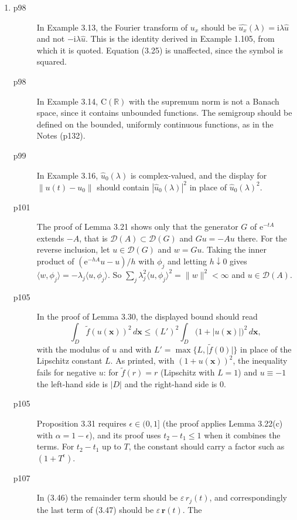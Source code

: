\documentclass[final]{article}
\theoremstyle{definition}
\newcommand{\vecbs}[1]{\boldsymbol{#1}}
\renewcommand{\vec}[1]{{\vecbs{#1}}}
\begin{document}
\begin{enumerate}
\begin{description}
   \end{description}
 \item%
   \begin{description}
   \item[p98] In Example 3.13, the Fourier transform of $u_x$ should be
$\widehat{u_x}(\lambda)=\mathrm{i}\lambda\widehat{u}$ and not
$-\mathrm{i}\lambda\widehat{u}$. This is the identity derived in Example 1.105,
from which it is quoted. Equation (3.25) is unaffected, since the symbol is
squared.
 
   \item[p98] In Example 3.14, $\mathrm{C}(\mathbb{R})$ with the supremum norm is
not a Banach space, since it contains unbounded functions. The semigroup should
be defined on the bounded, uniformly continuous functions, as in the Notes
(p132).
   \item[p99] In Example 3.16, $\hat u_0(\lambda)$ is complex-valued, and the
display for $\|u(t)-u_0\|$ should contain $|\hat u_0(\lambda)|^2$ in place of
$\hat u_0(\lambda)^2$.
   \item[p101] The proof of Lemma 3.21 shows only that the generator $G$ of
$\mathrm{e}^{-tA}$ extends $-A$, that is $\mathcal{D}(A)\subset\mathcal{D}(G)$
and $Gu=-Au$ there. For the reverse inclusion, let $u\in\mathcal{D}(G)$ and
$w=Gu$. Taking the inner product of $(\mathrm{e}^{-hA}u-u)/h$ with $\phi_j$ and
letting $h\downarrow0$ gives $\langle w,\phi_j\rangle=-\lambda_j\langle
u,\phi_j\rangle$. So $\sum_j\lambda_j^2\langle u,\phi_j\rangle^2=\|w\|^2<\infty$
and $u\in\mathcal{D}(A)$.
   \item[p105] In the proof of Lemma 3.30, the displayed bound should read
\[
\int_D \tilde f(u(\vec x))^2\,d\vec x \le (L')^2\int_D \bigl(1+\lvert u(\vec x)\rvert\bigr)^2\,d\vec x,
\]
with the modulus of $u$ and with $L'=\max\{L,\lvert \tilde f(0)\rvert\}$ in place
of the Lipschitz constant $L$. As printed, with $(1+u(\vec x))^2$, the
inequality fails for negative $u$: for $\tilde f(r)=r$ (Lipschitz with $L=1$)
and $u\equiv-1$ the left-hand side is $\lvert D\rvert$ and the right-hand side
is $0$.
   \item[p105] Proposition 3.31 requires $\epsilon\in(0,1]$ (the proof applies
Lemma 3.22(c) with $\alpha=1-\epsilon$), and its proof uses $t_2-t_1\le1$ when
it combines the terms. For $t_2-t_1$ up to $T$, the constant should carry a
factor such as $(1+T^{\epsilon})$.
   \item[p107] In (3.46) the remainder term should be $\varepsilon\, r_j(t)$, and
correspondingly the last term of (3.47) should be $\varepsilon\,\vec r(t)$. The

\end{description}
\end{enumerate}
\end{document}
